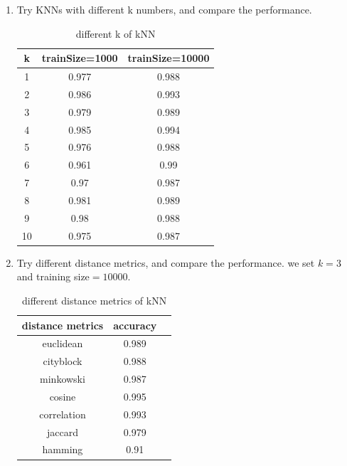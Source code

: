 \documentclass[oneside]{article}
\begin{document}
\begin{enumerate}
\item Try KNNs with different k numbers, and compare the performance.
\begin{table}[!htbp]
\centering
\begin{tabular}{|c|c|c|}
\hline
 k & trainSize=1000  & trainSize=10000 \\
\hline
1 & 0.977 & 0.988   \\
\hline
2 & 0.986 & 0.993  \\
\hline
3 & 0.979 & 0.989   \\
\hline
4 & 0.985 & 0.994   \\
\hline
5 & 0.976 & 0.988   \\
\hline
6 & 0.961 & 0.99   \\
\hline
7 & 0.97 & 0.987   \\
\hline
8 & 0.981 & 0.989   \\
\hline
9 & 0.98 & 0.988   \\
\hline
10 & 0.975 & 0.987  \\
\hline
\end{tabular}
\caption{different k of kNN}
\end{table}
\item Try different distance metrics, and compare the performance.
we set $k=3$ and training size$=10000$.
\begin{table}[!htbp]
\centering
\begin{tabular}{|c|c|c|}
\hline
distance metrics & accuracy  \\
\hline
euclidean & 0.989 \\
\hline
cityblock & 0.988 \\
\hline
minkowski & 0.987 \\
\hline
cosine & 0.995   \\
\hline
correlation & 0.993 \\
\hline
jaccard & 0.979 \\
\hline
hamming& 0.91  \\
\hline
\end{tabular}
\caption{different distance metrics of kNN}
\end{table}
\end{enumerate}
\end{document}
